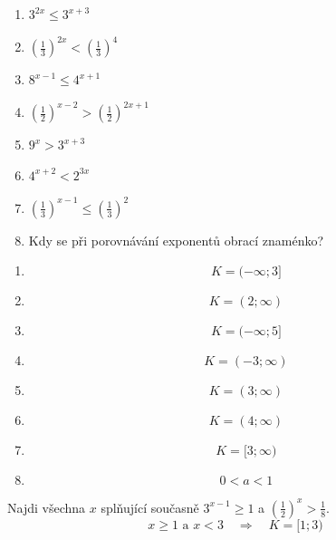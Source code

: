 \documentclass[11pt,a4paper]{article}
\begin{document}
\begin{zadaniReseniBox}[title={Samostatná práce 1}]
\begin{enumerate}[label=\alph*)]
\item $3^{2x}\le3^{x+3}$
\item $\left(\frac13\right)^{2x}<\left(\frac13\right)^4$
\item $8^{x-1}\le4^{x+1}$
\item $\left(\frac12\right)^{x-2}>\left(\frac12\right)^{2x+1}$
\item $9^x>3^{x+3}$
\item $4^{x+2}<2^{3x}$
\item $\left(\frac13\right)^{x-1}\le\left(\frac13\right)^2$
\item Kdy se při porovnávání exponentů obrací znaménko?
\end{enumerate}
\tcblower
\begin{enumerate}[label=\alph*)]
\item \[
K=(-\infty;3]
\]
\item \[
K=(2;\infty)
\]
\item \[
K=(-\infty;5]
\]
\item \[
K=(-3;\infty)
\]
\item \[
K=(3;\infty)
\]
\item \[
K=(4;\infty)
\]
\item \[
K=[3;\infty)
\]
\item \[
0<a<1
\]
\end{enumerate}
\end{zadaniReseniBox}
\begin{zadaniReseniBox}[title={Rozšíření 1}]
Najdi všechna $x$ splňující současně $3^{x-1}\ge1$ a $\left(\frac12\right)^x>\frac18$.
\tcblower
\[
x\ge1\text{ a }x<3\quad\Rightarrow\quad K=[1;3)
\]
\end{zadaniReseniBox}
\end{document}
